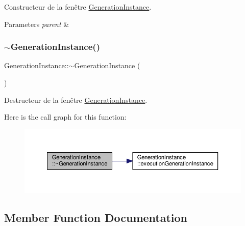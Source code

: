 Constructeur de la fenêtre \hyperlink{classGenerationInstance}{Generation\+Instance}. 


\begin{DoxyParams}{Parameters}
{\em parent} & \\
\hline
\end{DoxyParams}
\mbox{\label{classGenerationInstance_a14cdea0af4a47deb38a3a5fa59bb6d40}} 
\subsubsection{\texorpdfstring{$\sim$\+Generation\+Instance()}{~GenerationInstance()}}
{\footnotesize\ttfamily Generation\+Instance\+::$\sim$\+Generation\+Instance (\begin{DoxyParamCaption}{ }\end{DoxyParamCaption})}



Destructeur de la fenêtre \hyperlink{classGenerationInstance}{Generation\+Instance}. 

Here is the call graph for this function\+:\nopagebreak
\begin{figure}[H]
\begin{center}
\leavevmode
\includegraphics[width=350pt]{classGenerationInstance_a14cdea0af4a47deb38a3a5fa59bb6d40_cgraph}
\end{center}
\end{figure}


\subsection{Member Function Documentation}
\mbox{\label{classGenerationInstance_a7e47ea4abf8249c100c253a142f9c5d0}} 
